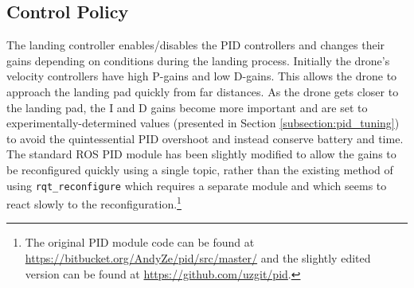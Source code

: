 

\subsection{Control Policy}
\label{subsection:control_policy}

The landing controller enables/disables the PID controllers and changes their gains depending on conditions during the landing process. Initially the drone's velocity controllers have high P-gains and low D-gains. This allows the drone to approach the landing pad quickly from far distances. As the drone gets closer to the landing pad, the I and D gains become more important and are set to experimentally-determined values (presented in Section \ref{subsection:pid_tuning}) to avoid the quintessential PID overshoot and instead conserve battery and time. The standard ROS PID module has been slightly modified to allow the gains to be reconfigured quickly using a single topic, rather than the existing method of using \texttt{rqt\_reconfigure} which requires a separate module and which seems to react slowly to the reconfiguration.\footnote{The original PID module code can be found at \url{https://bitbucket.org/AndyZe/pid/src/master/} and the slightly edited version can be found at \url{https://github.com/uzgit/pid}.}

